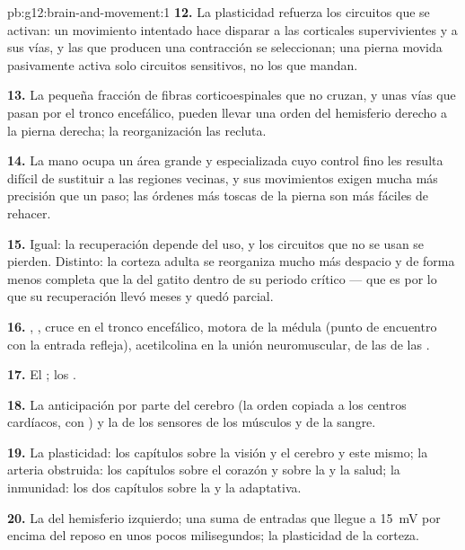 \begin{solution}{pb:g12:brain-and-movement:1}
\textbf{12.} La plasticidad refuerza los circuitos que se activan: un
movimiento intentado hace disparar a las  corticales
supervivientes y a sus vías, y las que producen una contracción se
seleccionan; una pierna movida pasivamente activa solo circuitos
sensitivos, no los que mandan.

\textbf{13.} La pequeña fracción de fibras corticoespinales que no
cruzan, y unas vías que pasan por el tronco encefálico, pueden llevar
una orden del hemisferio derecho a la pierna derecha; la reorganización
las recluta.

\textbf{14.} La mano ocupa un área grande y especializada cuyo control
fino les resulta difícil de sustituir a las regiones vecinas, y sus
movimientos exigen mucha más precisión que un paso; las órdenes más
toscas de la pierna son más fáciles de rehacer.

\textbf{15.} Igual: la recuperación depende del uso, y los circuitos
que no se usan se pierden. Distinto: la corteza adulta se reorganiza
mucho más despacio y de forma menos completa que la del gatito dentro
de su periodo crítico --- que es por lo que su recuperación llevó meses
y quedó parcial.

\textbf{16.} , , cruce en el tronco
encefálico,  motora de la médula (punto de encuentro con la
entrada refleja), acetilcolina en la unión neuromuscular,  de las
 de las .

\textbf{17.} El ; los .

\textbf{18.} La anticipación por parte del cerebro (la orden copiada a
los centros cardíacos, con ) y la  de los
sensores de los músculos y de la sangre.

\textbf{19.} La plasticidad: los capítulos sobre la visión y el cerebro
y este mismo; la arteria obstruida: los capítulos sobre el corazón y
sobre la  y la salud; la inmunidad: los dos capítulos
sobre la  y la adaptativa.

\textbf{20.} La  del hemisferio izquierdo; una
suma de entradas que llegue a \qty{15}{mV} por encima del reposo en
unos pocos milisegundos; la plasticidad de la corteza.
\end{solution}
